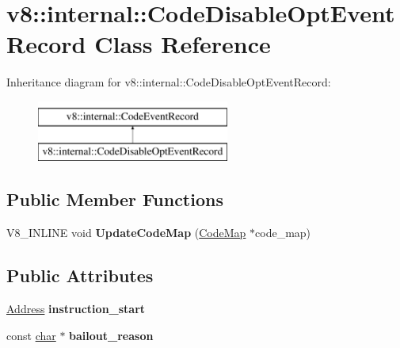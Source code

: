 \hypertarget{classv8_1_1internal_1_1CodeDisableOptEventRecord}{}\section{v8\+:\+:internal\+:\+:Code\+Disable\+Opt\+Event\+Record Class Reference}
\label{classv8_1_1internal_1_1CodeDisableOptEventRecord}
Inheritance diagram for v8\+:\+:internal\+:\+:Code\+Disable\+Opt\+Event\+Record\+:\begin{figure}[H]
\begin{center}
\leavevmode
\includegraphics[height=2.000000cm]{classv8_1_1internal_1_1CodeDisableOptEventRecord}
\end{center}
\end{figure}
\subsection*{Public Member Functions}
\begin{DoxyCompactItemize}
\item 
\mbox{\label{classv8_1_1internal_1_1CodeDisableOptEventRecord_a5777b78a1d3ccc2d0bef69c091eec09c}} 
V8\+\_\+\+I\+N\+L\+I\+NE void {\bfseries Update\+Code\+Map} (\mbox{\hyperlink{classv8_1_1internal_1_1CodeMap}{Code\+Map}} $\ast$code\+\_\+map)
\end{DoxyCompactItemize}
\subsection*{Public Attributes}
\begin{DoxyCompactItemize}
\item 
\mbox{\label{classv8_1_1internal_1_1CodeDisableOptEventRecord_a28166bb0ad9e33e36238b3c6219ea71a}} 
\mbox{\hyperlink{classuintptr__t}{Address}} {\bfseries instruction\+\_\+start}
\item 
\mbox{\label{classv8_1_1internal_1_1CodeDisableOptEventRecord_a2d72d8a8d6cf252077195aad743bb42d}} 
const \mbox{\hyperlink{classchar}{char}} $\ast$ {\bfseries bailout\+\_\+reason}
\end{DoxyCompactItemize}
